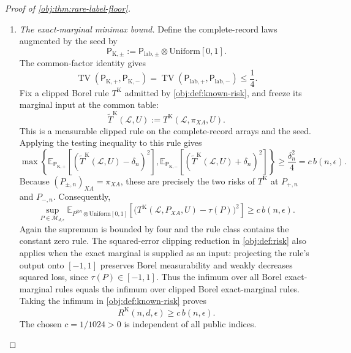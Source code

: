 \documentclass[11pt]{article}
\begin{document}
\begin{proof}[Proof of \cref{obj:thm:rare-label-floor}]
\begin{enumerate}
\item \textit{The exact-marginal minimax bound.}
Define the complete-record laws augmented by the seed by
\[
\mathsf P_{\mathrm K,\pm}
:=
\mathsf P_{\mathrm{lab},\pm}
\otimes\mathrm{Uniform}[0,1].
\]
The common-factor identity gives
\[
\operatorname{TV}
(\mathsf P_{\mathrm K,+},\mathsf P_{\mathrm K,-})
=
\operatorname{TV}
(\mathsf P_{\mathrm{lab},+},\mathsf P_{\mathrm{lab},-})
\le\frac14.
\]
Fix a clipped Borel rule \(T^{\mathrm K}\) admitted by
\cref{obj:def:known-risk}, and freeze its marginal input at the common
table:
\[
\widetilde T^{\mathrm K}(\mathcal L,U)
:=
T^{\mathrm K}(\mathcal L,\pi_{XA},U).
\]
This is a measurable clipped rule on the complete-record arrays and the
seed. Applying the testing inequality to this rule gives
\[
\max\left\{
\mathbb E_{\mathsf P_{\mathrm K,+}}
[(\widetilde T^{\mathrm K}(\mathcal L,U)-\delta_n)^2],
\mathbb E_{\mathsf P_{\mathrm K,-}}
[(\widetilde T^{\mathrm K}(\mathcal L,U)+\delta_n)^2]
\right\}
\ge\frac{\delta_n^2}{4}
=c\,b(n,\epsilon).
\]
Because \((P_{\pm,n})_{XA}=\pi_{XA}\), these are precisely the two risks
of \(T^{\mathrm K}\) at \(P_{+,n}\) and \(P_{-,n}\). Consequently,
\[
\sup_{P\in\mathcal M_{d,\epsilon}}
\mathbb E_{P^{\otimes n}\otimes\mathrm{Uniform}[0,1]}
\left[
\bigl(T^{\mathrm K}(\mathcal L,P_{XA},U)-\tau(P)\bigr)^2
\right]
\ge c\,b(n,\epsilon).
\]
Again the supremum is bounded by four and the rule class contains the
constant zero rule. The squared-error clipping reduction in
\cref{obj:def:risk} also applies when the exact marginal is supplied as
an input: projecting the rule's output onto \([-1,1]\) preserves Borel
measurability and weakly decreases squared loss, since
\(\tau(P)\in[-1,1]\). Thus the infimum over all Borel exact-marginal
rules equals the infimum over clipped Borel exact-marginal rules.
Taking the infimum in \cref{obj:def:known-risk}
proves
\[
R^{\mathrm K}(n,d,\epsilon)\ge c\,b(n,\epsilon).
\]
The chosen \(c=1/1024>0\) is independent of all public indices.


\end{enumerate}
\end{proof}
\end{document}

